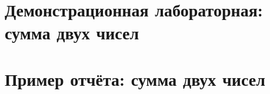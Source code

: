 \chapter{Демонстрационная лабораторная: сумма двух чисел}
\label{supplementary:demo-lab}
\begingroup
\setlength{\emergencystretch}{2em}
\providecommand{\tightlist}{\setlength{\itemsep}{0pt}\setlength{\parskip}{0pt}}

\endgroup

\chapter{Пример отчёта: сумма двух чисел}
\label{supplementary:example-report}
\begingroup
\setlength{\emergencystretch}{2em}
\providecommand{\tightlist}{\setlength{\itemsep}{0pt}\setlength{\parskip}{0pt}}

\endgroup
